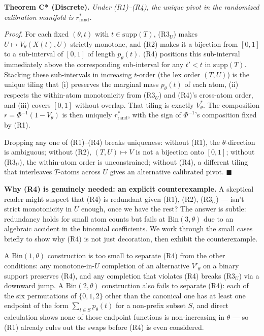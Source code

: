 \documentclass[11pt]{article}
\begin{document}
\textbf{Theorem C* (Discrete).} \emph{Under (R1)--(R4), the unique pivot
in the randomized calibration manifold is \(r^*_\mathrm{rand}\).}

\emph{Proof.} For each fixed \((\theta, t)\) with \(t \in \mathrm{supp}(T)\),
(R3\(_U\)) makes \(U \mapsto V_\theta(X(t), U)\) strictly monotone, and
(R2) makes it a bijection from \([0,1]\) to a sub-interval of \([0,1]\)
of length \(p_\theta(t)\). (R4) positions this sub-interval immediately
above the corresponding sub-interval for any \(t' < t\) in
\(\mathrm{supp}(T)\). Stacking these sub-intervals in increasing
\(t\)-order (the lex order \((T, U)\)) is the unique tiling that
(i) preserves the marginal mass \(p_\theta(t)\) of each atom, (ii)
respects the within-atom monotonicity from (R3\(_U\)) and (R4)'s
cross-atom order, and (iii) covers \([0,1]\) without overlap. That
tiling is exactly \(V^*_\theta\). The composition
\(r = \Phi^{-1}(1 - V_\theta)\) is then uniquely \(r^*_\mathrm{rand}\),
with the sign of \(\Phi^{-1}\)'s composition fixed by (R1).

Dropping any one of (R1)--(R4) breaks uniqueness: without (R1), the
\(\theta\)-direction is ambiguous; without (R2), \((T, U) \mapsto V\) is
not a bijection onto \([0,1]\); without (R3\(_U\)), the within-atom
order is unconstrained; without (R4), a different tiling that
interleaves \(T\)-atoms across \(U\) gives an alternative calibrated
pivot. \(\blacksquare\)

\textbf{Why (R4) is genuinely needed: an explicit counterexample.}
A skeptical reader might suspect that (R4) is redundant given
(R1), (R2), (R3\(_U\)) --- isn't strict monotonicity in \(U\) enough,
once we have the rest? The answer is subtle: redundancy holds for
small atom counts but fails at \(\mathrm{Bin}(3, \theta)\) due to an
algebraic accident in the binomial coefficients. We work through the
small cases briefly to show why (R4) is not just decoration, then
exhibit the counterexample.

A \(\mathrm{Bin}(1, \theta)\) construction is too small to separate
(R4) from the other conditions: any monotone-in-\(U\) completion of an
alternative \(V'_\theta\) on a binary support preserves (R4), and any
completion that violates (R4) breaks (R3\(_U\)) via a downward jump. A
\(\mathrm{Bin}(2, \theta)\) construction also fails to separate (R4):
each of the six permutations of \(\{0, 1, 2\}\) other than the
canonical one has at least one endpoint of the form
\(\sum_{t \in S} p_\theta(t)\) for a non-prefix subset \(S\), and direct
calculation shows none of those endpoint functions is non-increasing
in \(\theta\) --- so (R1) already rules out the swaps before (R4) is
even considered.
\end{document}
